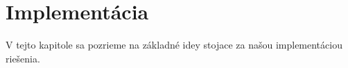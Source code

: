 \chapter{Implementácia}

V tejto kapitole sa pozrieme na základné idey stojace za našou implementáciou
riešenia.
